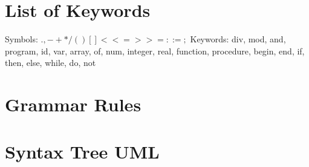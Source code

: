 \documentclass[10]{article}
\begin{document}
\newpage
\begin{appendices}

\section{List of Keywords}
\label{keywords}
Symbols: $ . , - + * / ( ) { } [ ] { } < <= > >= : := ;$  
\newline
Keywords: div, mod, and, program, id, var, array, of, num, integer, real, function, procedure, begin, end, if, then, else, while, do, not

\section{Grammar Rules}
\label{grammars}


\section{Syntax Tree UML}
\begin{figure}[!thp]
	\centering
	\hfill
\end{figure}

\begin{figure}[!thp]
	\centering
	\hfill
	\caption{}
\end{figure}


\end{appendices}
\end{document}
